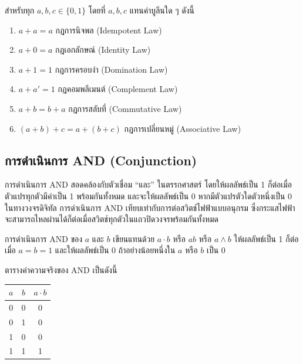 \begin{prop}
สำหรับทุก $a, b, c \in \{0, 1\}$ โดยที่ $a, b, c$ แทนค่าบูลีนใด ๆ ดังนี้

\begin{enumerate}
    \item $a + a = a$ \hfill กฎการนิจพล (Idempotent Law)
    \item $a + 0 = a$ \hfill กฎเอกลักษณ์ (Identity Law)
    \item $a + 1 = 1$ \hfill กฎการครอบงำ (Domination Law)
    \item $a + a' = 1$ \hfill กฎคอมพลีเมนต์ (Complement Law)
    \item $a + b = b + a$ \hfill กฎการสลับที่ (Commutative Law)
    \item $(a + b) + c = a + (b + c)$ \hfill กฎการเปลี่ยนหมู่ (Associative Law)
\end{enumerate}
\end{prop}

\subsection{การดำเนินการ AND (Conjunction)}
การดำเนินการ AND สอดคล้องกับตัวเชื่อม ``และ'' ในตรรกศาสตร์ โดยให้ผลลัพธ์เป็น 1 ก็ต่อเมื่อตัวแปรทุกตัวมีค่าเป็น 1 พร้อมกันทั้งหมด และจะให้ผลลัพธ์เป็น 0 หากมีตัวแปรตัวใดตัวหนึ่งเป็น 0 ในทางวงจรดิจิทัล การดำเนินการ AND เทียบเท่ากับการต่อสวิตช์ไฟฟ้าแบบอนุกรม ซึ่งกระแสไฟฟ้าจะสามารถไหลผ่านได้ก็ต่อเมื่อสวิตช์ทุกตัวในแถวปิดวงจรพร้อมกันทั้งหมด~\parencite{roth2021logic}

\begin{definition}
การดำเนินการ AND ของ $a$ และ $b$ เขียนแทนด้วย $a \cdot b$ หรือ $ab$ หรือ $a \land b$ ให้ผลลัพธ์เป็น 1 ก็ต่อเมื่อ $a = b = 1$ และให้ผลลัพธ์เป็น 0 ถ้าอย่างน้อยหนึ่งใน $a$ หรือ $b$ เป็น 0
\end{definition}

ตารางค่าความจริงของ AND เป็นดังนี้
\begin{center}
\begin{tabular}{|c|c|c|}
\hline
$a$ & $b$ & $a \cdot b$ \\
\hline
0 & 0 & 0 \\
\hline
0 & 1 & 0 \\
\hline
1 & 0 & 0 \\
\hline
1 & 1 & 1 \\
\hline
\end{tabular}
\end{center}

